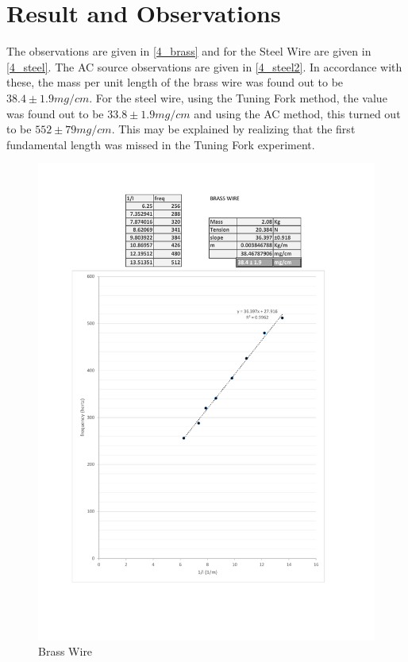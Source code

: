 \section{Result and Observations}
	The observations are given in \autoref{4_brass} and for the Steel Wire are given in \autoref{4_steel}. The AC source observations are given in \autoref{4_steel2}. In accordance with these, the mass per unit length of the brass wire was found out to be $38.4 \pm 1.9 mg/cm$. For the steel wire, using the Tuning Fork method, the value was found out to be $33.8 \pm 1.9 mg/cm$ and using the AC method, this turned out to be $552 \pm 79 mg/cm$. This may be explained by realizing that the first fundamental length was missed in the Tuning Fork experiment.
	\begin{figure}[bth]
		\begin{center}
			\includegraphics[width=1.3\linewidth]{gfx/brass}
		\end{center}
		\caption[Brass Wire]{Brass Wire}
	\label{4_brass}
	\end{figure}


